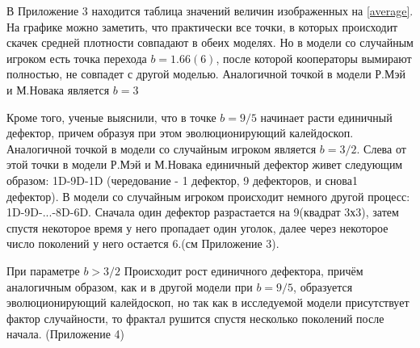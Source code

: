 \documentclass[12pt,a4paper]{article}
\begin{document}
	В Приложение 3 находится таблица значений величин изображенных на \ref{average}. На графике можно заметить, что практически все точки, в которых происходит скачек средней плотности совпадают в обеих моделях. Но в модели со случайным игроком есть точка перехода $b=1.66(6)$, после которой кооператоры вымирают полностью, не совпадет с другой моделью. Аналогичной точкой в модели Р.Мэй и М.Новака является $b=3$
	
	\par Кроме того, ученые выяснили, что в точке $b=9/5$ начинает расти единичный дефектор, причем образуя при этом эволюционирующий калейдоскоп. Аналогичной точкой в модели со случайным игроком является $b=3/2$. Слева от этой точки в модели Р.Мэй и М.Новака единичный дефектор живет следующим образом: 1D-9D-1D (чередование - 1 дефектор, 9 дефекторов, и снова1 дефектор). В модели со случайным игроком происходит немного другой процесс: 1D-9D-...-8D-6D. Сначала один дефектор разрастается на 9(квадрат 3х3), затем спустя некоторое время у него пропадает один уголок, далее через некоторое число поколений у него остается 6.(см Приложение 3).
	
	\par При параметре $b>3/2$ Происходит рост единичного дефектора, причём аналогичным образом, как и в другой модели при $b=9/5$, образуется эволюционирующий калейдоскоп, но так как в исследуемой модели присутствует фактор случайности, то фрактал рушится спустя несколько поколений после начала. (Приложение 4)
\end{document}
